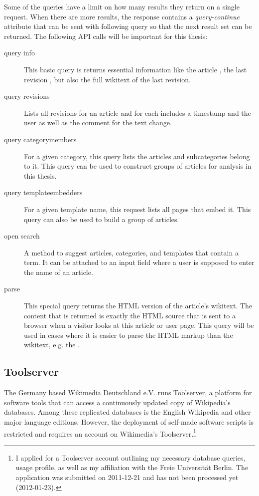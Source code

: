 Some of the queries have a limit on how many results they return on a single request.
When there are more results, the response contains a \emph{query-continue} attribute that can be sent with following query so that the next result set can be returned.
The following \ac{API} calls will be important for this thesis:

\begin{description}
    \item[query info] This basic query is returns essential information like the article , the last revision , but also the full wikitext of the last revision.
    \item[query revisions] Lists all revisions for an article and for each includes a timestamp and the user as well as the comment for the text change.
    \item[query categorymembers] For a given category, this query lists the articles and subcategories belong to it.
    This query can be used to construct groups of articles for analysis in this thesis.
    \item[query templateembedders] For a given template name, this request lists all pages that embed it.
    This query can also be used to build a group of articles. 
    \item[open search] A method to suggest articles, categories, and templates that contain a term. 
    It can be attached to an input field where a user is supposed to enter the name of an article.
    \item[parse] This special query returns the \ac{HTML} version of the article's wikitext.
    The content that is returned is exactly the \ac{HTML} source that is sent to a browser when a visitor looks at this article or user page.
    This query will be used in cases where it is easier to parse the \ac{HTML} markup than the wikitext, e.g. the .
\end{description}

\subsection{Toolserver}\label{sub:toolserver}

The Germany based Wikimedia Deutschland e.V. runs Toolserver, a platform for software tools that can access a continuously updated copy of Wikipedia's databases. 
Among these replicated databases is the English Wikipedia and other major language editions.
However, the deployment of self-made software scripts is restricted and requires an account on Wikimedia's Toolserver.\footnote{I applied for a Toolserver account outlining my necessary database queries, usage profile, as well as my affiliation with the Freie Universit\"at Berlin. The application was submitted on 2011-12-21 and has not been processed yet (2012-01-23).}

